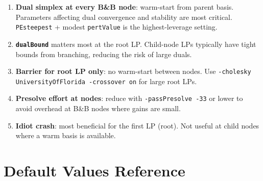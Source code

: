 \documentclass[11pt,a4paper]{article}
\newcommand{\val}[1]{\texttt{#1}}
\begin{document}
\begin{enumerate}
  \item \textbf{Dual simplex at every B\&B node}: warm-start from parent basis.
        Parameters affecting dual convergence and stability are most critical.
        \val{PEsteepest} + modest \val{pertValue} is the highest-leverage setting.
  \item \textbf{\texttt{dualBound}} matters most at the root LP. Child-node LPs
        typically have tight bounds from branching, reducing the risk of large duals.
  \item \textbf{Barrier for root LP only}: no warm-start between nodes. Use
        \val{-cholesky UniversityOfFlorida -crossover on} for large root LPs.
  \item \textbf{Presolve effort at nodes}: reduce with \val{-passPresolve -33} or
        lower to avoid overhead at B\&B nodes where gains are small.
  \item \textbf{Idiot crash}: most beneficial for the first LP (root). Not useful
        at child nodes where a warm basis is available.
\end{enumerate}

\section{Default Values Reference}
\label{sec:defaults}
\end{document}
